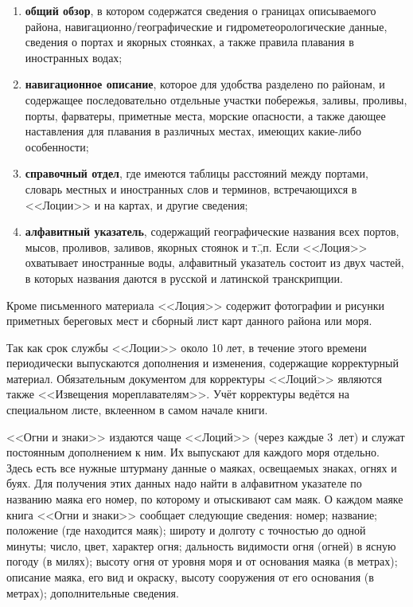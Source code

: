 \begin{enumerate}
\item \textbf{общий обзор}, в котором содержатся сведения о границах
  описываемого района, навигационно\-/географические и
  гидрометеорологические данные, сведения о портах и якорных стоянках,
  а также правила плавания в иностранных водах;
\item \textbf{навигационное описание}, которое для удобства разделено
  по районам, и содержащее последовательно отдельные участки
  побережья, заливы, проливы, порты, фарватеры, приметные места,
  морские опасности, а также дающее наставления для плавания в
  различных местах, имеющих какие-либо особенности;
\item \textbf{справочный отдел}, где имеются таблицы расстояний между
  портами, словарь местных и иностранных слов и терминов,
  встречающихся в <<Лоции>> и на картах, и другие сведения;
\item \textbf{алфавитный указатель}, содержащий географические
  названия всех портов, мысов, проливов, заливов, якорных стоянок и
  т.\=,п. Если <<Лоция>> охватывает иностранные воды, алфавитный
  указатель состоит из двух частей, в которых названия даются в
  русской и латинской транскрипции.
\end{enumerate}

Кроме письменного материала <<Лоция>> содержит фотографии и рисунки
приметных береговых мест и сборный лист карт данного района или моря.

Так как срок службы <<Лоции>> около 10 лет, в течение этого времени
периодически выпускаются дополнения и изменения, содержащие
корректурный материал. Обязательным документом для корректуры
<<Лоций>> являются также <<Извещения мореплавателям>>. Учёт корректуры
ведётся на специальном листе, вклеенном в самом начале книги.

<<Огни и знаки>> издаются чаще <<Лоций>> (через каждые 3~лет) и
служат постоянным дополнением к ним. Их выпускают для каждого моря
отдельно. Здесь есть все нужные штурману данные о маяках, освещаемых
знаках, огнях и буях. Для получения этих данных надо найти в
алфавитном указателе по названию маяка его номер, по которому и
отыскивают сам маяк. О каждом маяке книга <<Огни и знаки>> сообщает
следующие сведения: номер; название; положение (где находится маяк);
широту и долготу с точностью до одной минуты; число, цвет, характер
огня; дальность видимости огня (огней) в ясную погоду (в милях);
высоту огня от уровня моря и от основания маяка (в метрах); описание
маяка, его вид и окраску, высоту сооружения от его основания (в
метрах); дополнительные сведения.

